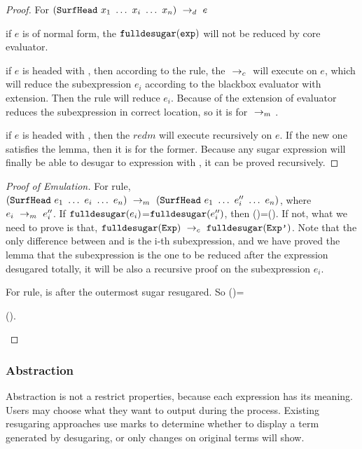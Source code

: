 \begin{proof}
For $(\mbox{\tt SurfHead}~x_1~\ldots~x_i~\ldots~x_n) ~\rightarrow_d~ e$

if $e$ is of normal form, the $\mbox{\tt fulldesugar}(\mbox{\tt exp})$ will not be reduced by core evaluator.

if $e$ is headed with , then according to the  rule, the $~\rightarrow_c~$ will execute on $e$, which will reduce the subexpression $e_i$ according to the blackbox evaluator with extension. Then the  rule will reduce $e_i$. Because of the extension of evaluator reduces the subexpression in correct location, so it is for $~\rightarrow_m~$.

if $e$ is headed with , then the $redm{}{}$ will execute recursively on $e$. If the new one satisfies the lemma, then it is for the former. Because any sugar expression will finally be able to desugar to expression with , it can be proved recursively.
\end{proof}
\begin{proof}[Proof of Emulation]
\hfill

For  rule, $(\mbox{\tt SurfHead}~e_1~\ldots~e_i~\ldots~e_n) ~\rightarrow_m~(\mbox{\tt SurfHead}~e_1~\ldots~e_i''~\ldots~e_n)$, where $e_i ~\rightarrow_m~e_i''$. 
If $\mbox{\tt fulldesugar}(e_i)$=$\mbox{\tt fulldesugar}(e_i'')$, then ()=(). If not,  what we need to prove is that, $\mbox{\tt fulldesugar}(\mbox{\tt Exp}) ~\rightarrow_c~\mbox{\tt fulldesugar}(\mbox{\tt Exp'})$. Note that the only difference between  and  is the i-th subexpression, and we have proved the lemma that the subexpression is the one to be reduced after the expression desugared totally, it will be also a recursive proof on the subexpression $e_i$.

For  rule,  is  after the outermost sugar resugared. So ()=

\begin{flushleft}
().
\end{flushleft}

\end{proof}

\subsubsection{Abstraction}
Abstraction is not a restrict properties, because each expression has its meaning. Users may choose what they want to output during the process. Existing resugaring approaches use marks to determine whether to display a term generated by desugaring, or only changes on original terms will show.

